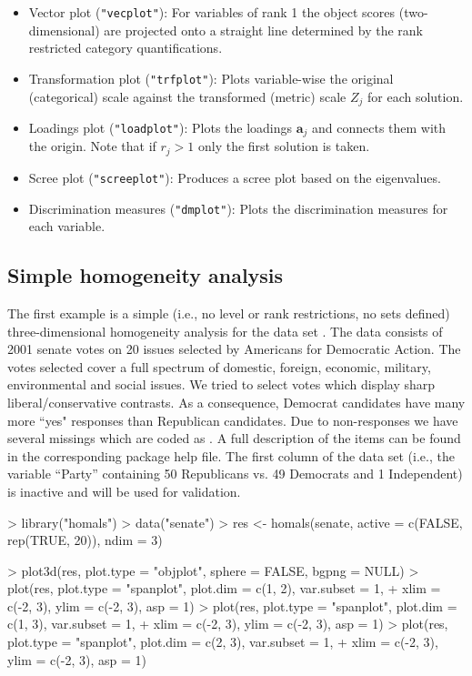 \documentclass[article, nojss]{jss}
\begin{document}
\begin{itemize}
\item Vector plot (\texttt{"vecplot"}): For variables of rank 1 the object scores (two-dimensional) are projected onto a straight line determined by the rank restricted category quantifications.
\item Transformation plot (\texttt{"trfplot"}): Plots variable-wise the original (categorical) scale against the transformed (metric) scale $Z_j$ for each solution.
\item Loadings plot (\texttt{"loadplot"}): Plots the loadings $\mathbf{a}_j$ and connects them with the origin. Note that if $r_j > 1$ only the first solution is taken.
\item Scree plot (\texttt{"screeplot"}): Produces a scree plot based on the eigenvalues. 
\item Discrimination measures (\texttt{"dmplot"}): Plots the discrimination measures for each variable. 
\end{itemize} 


\subsection{Simple homogeneity analysis}
\label{sec:sha}
The first example is a simple (i.e., no level or rank restrictions, no sets defined) three-dimensional homogeneity analysis for the  data set \citep{Ada:02}. The data consists of 2001 senate votes on 20 issues selected by Americans for Democratic Action. The votes selected cover a full spectrum of domestic, foreign, economic, military, environmental and social issues. We tried to select votes which display sharp liberal/conservative contrasts. As a consequence, Democrat candidates have many more ``yes" responses than Republican candidates. Due to non-responses we have several missings which are coded as . A full description of the items can be found in the corresponding package help file. The first column of the data set (i.e., the variable ``Party'' containing 50 Republicans vs. 49 Democrats and 1 Independent) is inactive and will be used for validation. 

\begin{Schunk}
\begin{Sinput}
> library("homals")
> data("senate")
> res <- homals(senate, active = c(FALSE, rep(TRUE, 20)), ndim = 3)
\end{Sinput}
\end{Schunk}
\begin{Schunk}
\begin{Sinput}
> plot3d(res, plot.type = "objplot", sphere = FALSE, bgpng = NULL)
> plot(res, plot.type = "spanplot", plot.dim = c(1, 2), var.subset = 1, 
+     xlim = c(-2, 3), ylim = c(-2, 3), asp = 1)
> plot(res, plot.type = "spanplot", plot.dim = c(1, 3), var.subset = 1, 
+     xlim = c(-2, 3), ylim = c(-2, 3), asp = 1)
> plot(res, plot.type = "spanplot", plot.dim = c(2, 3), var.subset = 1, 
+     xlim = c(-2, 3), ylim = c(-2, 3), asp = 1)
\end{Sinput}
\end{Schunk}
\end{document}
